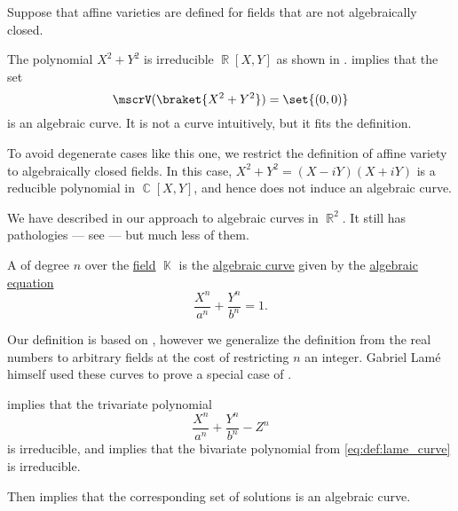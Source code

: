 \begin{example}\label{ex:real_algebraic_curves}
  Suppose that affine varieties are defined for fields that are not algebraically closed.

  The polynomial \( X^2 + Y^2 \) is irreducible \( \BbbR[X, Y] \) as shown in .  implies that the set
  \begin{equation*}
    \mscrV(\braket{ X^2 + Y^2 }) = \set{ (0, 0) }
  \end{equation*}
  is an algebraic curve. It is not a curve intuitively, but it fits the definition.

  To avoid degenerate cases like this one, we restrict the definition of affine variety to algebraically closed fields. In this case, \( X^2 + Y^2 = (X - iY) (X + iY) \) is a reducible polynomial in \( \BbbC[X, Y] \), and hence does not induce an algebraic curve.

  We have described in  our approach to algebraic curves in \( \BbbR^2 \). It still has pathologies --- see  --- but much less of them.
\end{example}

\begin{definition}\label{def:lame_curve}\mimprovised
  A  of degree \( n \) over the \hyperref[def:field]{field} \( \BbbK \) is the \hyperref[def:algebraic_curve]{algebraic curve} given by the \hyperref[def:algebraic_equation]{algebraic equation}
  \begin{equation}\label{eq:def:lame_curve}
    \frac {X^n} {a^n} + \frac {Y^n} {b^n} = 1.
  \end{equation}
\end{definition}
\begin{comments}
  \item Our definition is based on \cite[179]{Савелов1960ПлоскиеКривые}, however we generalize the definition from the real numbers to arbitrary fields at the cost of restricting \( n \) an integer. Gabriel Lam\'{e} himself used these curves to prove a special case of .
\end{comments}
\begin{defproof}
   implies that the trivariate polynomial
  \begin{equation*}
    \frac {X^n} {a^n} + \frac {Y^n} {b^n} - Z^n
  \end{equation*}
  is irreducible, and  implies that the bivariate polynomial from \eqref{eq:def:lame_curve} is irreducible.

  Then  implies that the corresponding set of solutions is an algebraic curve.
\end{defproof}

